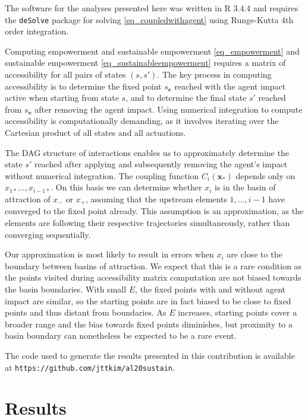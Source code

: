 \documentclass[conference]{IEEEtran}
\newcommand{\vectorsym}[1]{\ensuremath{\mathbf{#1}}}
\newcommand{\agentimpact}{\ensuremath{e}}
\newcommand{\couplingfunction}{\ensuremath{C}}
\newcommand{\impactstrength}{\ensuremath{E}}
\begin{document}
The software for the analyses presented here was written in R 3.4.4
\cite{RManual2018} and requires the \texttt{deSolve} package for
solving \eqref{eq_coupledwithagent} using Runge-Kutta 4th order
integration.

Computing empowerment and sustainable empowerment \eqref{eq_empowerment}
and sustainable empowerment \eqref{eq_sustainableempowerment} requires a
matrix of accessibility for all pairs of states $(s, s')$. The key
process in computing accessibility is to determine the fixed point
$s_{\vectorsym{\agentimpact}}$ reached with the agent impact active
when starting from state $s$, and to determine the final state $s'$
reached from $s_{\vectorsym{e}}$ after removing the agent impact.
Using numerical integration to compute accessibility is
computationally demanding, as it involves iterating over the Cartesian
product of all states and all actuations.

The DAG structure of interactions enables us to approximately
determine the state $s'$ reached after applying and subsequently
removing the agent's impact without numerical integration. The
coupling function $\couplingfunction_i(\vectorsym{x}_*)$ depends only
on $x_{1*} \ldots, x_{i-1*}$. On this basis we can determine whether
$x_i$ is in the basin of attraction of $x_{-}$ or $x_{+}$, assuming
that the upstream elements $1, \ldots, i - 1$ have converged to the
fixed point already. This assumption is an approximation, as the
elements are following their respective trajectories simultaneously,
rather than converging sequentially.

Our approximation is most likely to result in errors when $x_i$ are
close to the boundary between basins of attraction. We expect that
this is a rare condition as the points visited during accessibility
matrix computation are not biased towards the basin boundaries. With
small $\impactstrength$, the fixed points with and without agent impact are similar,
so the starting points are in fact biased to be close to fixed points
and thus distant from boundaries. As $\impactstrength$ increases, starting points
cover a broader range and the bias towards fixed points diminishes,
but proximity to a basin boundary can nonetheless be expected to be a
rare event.

The code used to generate the results presented in this contribution
is available at \texttt{https://github.com/jttkim/al20sustain}.


\section{Results}
\end{document}
